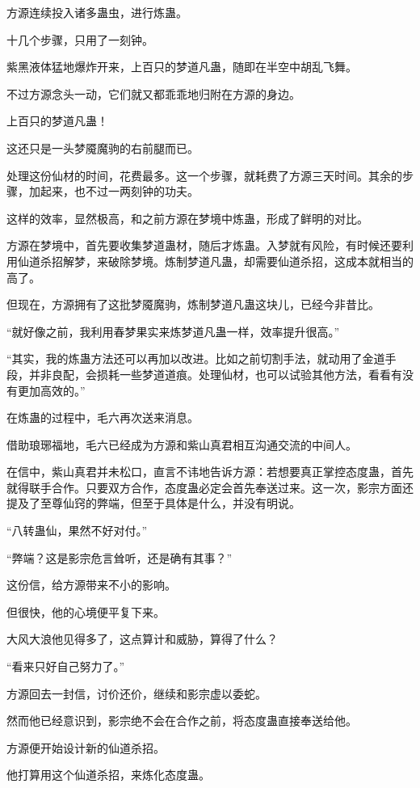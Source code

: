 \begin{this_body}
方源连续投入诸多蛊虫，进行炼蛊。

十几个步骤，只用了一刻钟。

紫黑液体猛地爆炸开来，上百只的梦道凡蛊，随即在半空中胡乱飞舞。

不过方源念头一动，它们就又都乖乖地归附在方源的身边。

上百只的梦道凡蛊！

这还只是一头梦魇魔驹的右前腿而已。

处理这份仙材的时间，花费最多。这一个步骤，就耗费了方源三天时间。其余的步骤，加起来，也不过一两刻钟的功夫。

这样的效率，显然极高，和之前方源在梦境中炼蛊，形成了鲜明的对比。

方源在梦境中，首先要收集梦道蛊材，随后才炼蛊。入梦就有风险，有时候还要利用仙道杀招解梦，来破除梦境。炼制梦道凡蛊，却需要仙道杀招，这成本就相当的高了。

但现在，方源拥有了这批梦魇魔驹，炼制梦道凡蛊这块儿，已经今非昔比。

“就好像之前，我利用春梦果实来炼梦道凡蛊一样，效率提升很高。”

“其实，我的炼蛊方法还可以再加以改进。比如之前切割手法，就动用了金道手段，并非良配，会损耗一些梦道道痕。处理仙材，也可以试验其他方法，看看有没有更加高效的。”

在炼蛊的过程中，毛六再次送来消息。

借助琅琊福地，毛六已经成为方源和紫山真君相互沟通交流的中间人。

在信中，紫山真君并未松口，直言不讳地告诉方源：若想要真正掌控态度蛊，首先就得联手合作。只要双方合作，态度蛊必定会首先奉送过来。这一次，影宗方面还提及了至尊仙窍的弊端，但至于具体是什么，并没有明说。

“八转蛊仙，果然不好对付。”

“弊端？这是影宗危言耸听，还是确有其事？”

这份信，给方源带来不小的影响。

但很快，他的心境便平复下来。

大风大浪他见得多了，这点算计和威胁，算得了什么？

“看来只好自己努力了。”

方源回去一封信，讨价还价，继续和影宗虚以委蛇。

然而他已经意识到，影宗绝不会在合作之前，将态度蛊直接奉送给他。

方源便开始设计新的仙道杀招。

他打算用这个仙道杀招，来炼化态度蛊。


\end{this_body}
